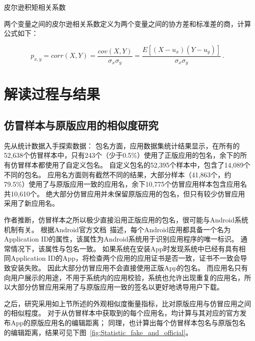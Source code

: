 \begin{Def}
    皮尔逊积矩相关系数

    两个变量之间的皮尔逊相关系数定义为两个变量之间的协方差和标准差的商，计算公式如下：
\end{Def}
\begin{equation}
    p_{x,y} = corr(X,Y)=\frac{cov(X,Y)}{\sigma_x\sigma_y}=\frac{E[(X-u_x)(Y-u_y)]}{\sigma_x\sigma_y} \,.
    \label{equ:PPMCC}
\end{equation}

\section{解读过程与结果}

\subsection{仿冒样本与原版应用的相似度研究}


先从统计数据入手探索数据：
包名方面，应用数据集统计结果显示，在所有的52,638个仿冒样本中，只有243个（少于0.5\%）使用了正版应用的包名，余下的所有仿冒样本都使用了自定义包名。
自定义包名的52,395个样本中，包含了14,089个不同的包名。
应用名方面则有截然不同的结果，大部分样本（41,863个，约79.5\%）使用了与原版应用一致的应用名，余下10,775个仿冒应用样本包含应用名共10,610个。
绝大部分仿冒应用并未保留原版应用的包名，但只有较少仿冒应用采用了新应用名。

作者推断，仿冒样本之所以极少直接沿用正版应用的包名，很可能与Android系统机制有关。
根据Android官方文档~\cite{setAppId}描述，每个Android应用都具备一个名为Application ID的属性，该属性为Android系统用于识别应用程序的唯一标识。
通常情况下，该属性与包名一致。
如果系统在安装App时发现系统中已经有具有相同Application ID的App，将检查两个应用的应用证书是否一致，证书不一致会导致安装失败。
因此大部分仿冒应用不会直接使用正版App的包名。
而应用名只有向用户展示的用途，不用于系统内的应用校验，系统也允许出现重复的应用名，所以大部分仿冒应用采用了与原版应用一致的签名以更好地诱导用户下载。

之后，研究采用如上节所述的外观相似度衡量指标，比对原版应用与仿冒应用之间的相似程度。
对于从仿冒样本中获取到的每个应用名，均计算与其对应的官方发布App的原版应用名的编辑距离；
同理，也计算出每个仿冒样本包名与原版包名的编辑距离，结果可见下图~\autoref{fig:Statistic_fake_and_official}。

